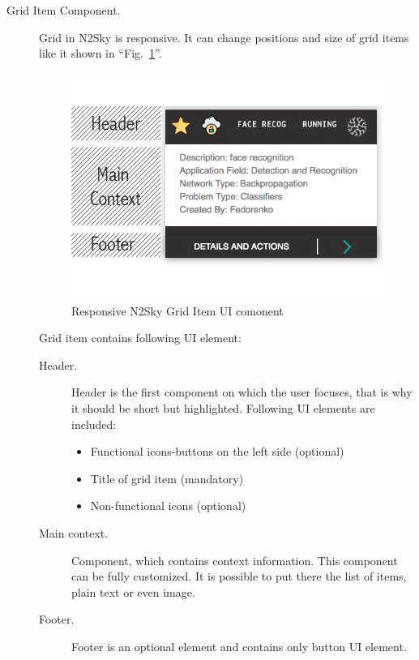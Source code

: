 \begin{description}
\item[Grid Item Component.] Grid in N2Sky is responsive. It can change positions and size of grid items like it shown in ``Fig.~\ref{fig:grid_item}''. 

\begin{figure}[htbp]
\begin{center}
  \includegraphics[scale=0.65]{components/3/components/grid_item.png}
  \caption{Responsive N2Sky Grid Item UI comonent}
  \label{fig:grid_item}
\end{center}
\end{figure}


Grid item contains following UI element: 
\begin{description}
\item[Header. ] Header is the first component on which the user focuses, that is why it should be short but highlighted. Following UI elements are included: 
\begin{itemize}
\item Functional icons-buttons on the left side (optional)
\item Title of grid item (mandatory)
\item  Non-functional icons (optional)
\end{itemize}
\item[Main context. ] Component, which contains context information. This component can be fully customized. It is possible to put there the list of items, plain text or even image.
 \item[Footer. ] Footer is an optional element and contains only button UI element. 
\end{description}


\end{description}
